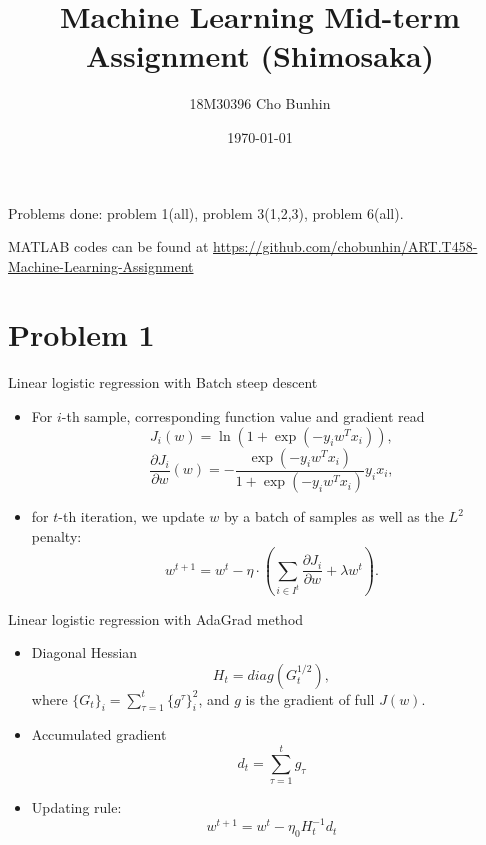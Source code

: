 \documentclass{article}
\begin{document}
\newcommand{\setr}{\mathbb{R}}
\newenvironment{myproof}[1][Proof.]{\begin{trivlist}
\item[\hskip \labelsep {\bfseries #1}]}{\end{trivlist}}


\title{Machine Learning Mid-term Assignment (Shimosaka)}
\author{18M30396 Cho Bunhin}
\date{\today} 
\maketitle
Problems done: problem 1(all), problem 3(1,2,3), problem 6(all).

MATLAB codes can be found at\newline
\small
\url{https://github.com/chobunhin/ART.T458-Machine-Learning-Assignment}
\section*{Problem 1}
\normalsize
Linear logistic regression with Batch steep descent
\begin{itemize}
	\item For $i$-th sample, corresponding function value and gradient read
		\begin{equation}
		J_i(w)=\ln(1+\exp(-y_iw^Tx_i)) ,
		\end{equation}
		\begin{equation}
		\frac{\partial J_i}{\partial w}(w)=-\frac{\exp(-y_iw^Tx_i)}{1+\exp(-y_iw^Tx_i)}y_ix_i,
		\end{equation}
	\item for $t$-th iteration, we update $w$ by a batch of samples as well as the $L^2$ penalty:
		\begin{equation}
		w^{t+1} = w^t - \eta \cdot \left(\sum_{i\in I^t}\frac{\partial J_i}{\partial w} + \lambda w^t\right).
		\end{equation}
\end{itemize}
Linear logistic regression with AdaGrad method
\begin{itemize}
	\item Diagonal Hessian 
		\begin{equation}
		  H_t = diag(G_t^{1/2}),
		\end{equation}
		where $\{G_t\}_i = \sum_{\tau=1}^{t}\{g^\tau\}_i^2$, and $g$ is the gradient of full $J(w)$.
  \item Accumulated gradient
    \begin{equation}
      d_t  = \sum_{\tau=1}^t g_{\tau}
    \end{equation}
  \item Updating rule:
  	\begin{equation}
  	  w^{t+1} = w^t - \eta_0 H_t^{-1}d_t
  	\end{equation}
\end{itemize}
\end{document}
